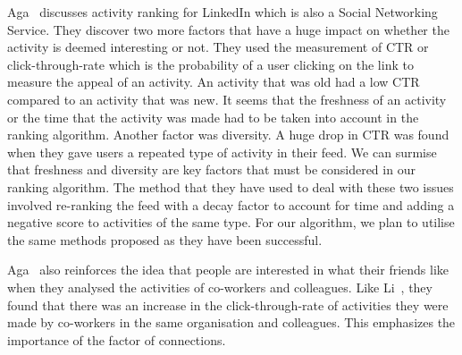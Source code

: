 Aga~\cite{Aga2014} discusses activity ranking for LinkedIn which is also a Social Networking Service. They discover two more factors that have a huge impact on whether the activity is deemed interesting or not. They used the measurement of CTR or click-through-rate which is the probability of a user clicking on the link to measure the appeal of an activity. An activity that was old had a low CTR compared to an activity that was new. It seems that the freshness of an activity or the time that the activity was made had to be taken into account in the ranking algorithm. Another factor was diversity. A huge drop in CTR was found when they gave users a repeated type of activity in their feed. We can surmise that freshness and diversity are key factors that must be considered in our ranking algorithm. The method that they have used to deal with these two issues involved re-ranking the feed with a decay factor to account for time and adding a negative score to activities of the same type. For our algorithm, we plan to utilise the same methods proposed as they have been successful.

Aga~\cite{Aga2014} also reinforces the idea that people are interested in what their friends like when they analysed the activities of co-workers and colleagues. Like Li~\cite{LiTiaLee2010}, they found that there was an increase in the click-through-rate of activities they were made by co-workers in the same organisation and colleagues. This emphasizes the importance of the factor of connections.
